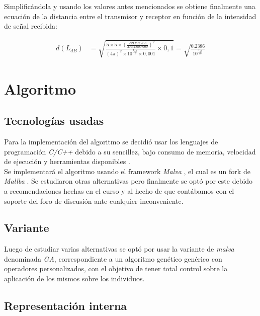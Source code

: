 \documentclass[journal]{IEEEtran}
\begin{document}
Simplificándola y usando los valores antes mencionados se obtiene finalmente una ecuación de la distancia entre el transmisor y receptor en función de la intensidad de señal recibida:

\begin{equation*}
\begin{split}
d(L_{dB}) &= \sqrt {\frac {5 \times 5 \times (\frac {299.792.458} {2.442.000.000})^2} {(4 \pi)^2 \times 10^{\frac {L_{dB}} {10}} \times 0,001} \times 0,1} = \sqrt {\frac {0.2386} {10^{\frac {L_{dB}} {10}}}}
\end{split}
\end{equation*}

\section{Algoritmo}

\subsection{Tecnologías usadas}

Para la implementación del algoritmo se decidió usar los lenguajes de programación \emph{C/C++} \cite{c} \cite{c++} debido a su sencillez, bajo consumo de memoria, velocidad de ejecución y herramientas disponibles \cite{why:c:c++}.\\

Se implementará el algoritmo usando el framework \emph{Malva} \cite{malva}, el cual es un fork de \emph{Mallba} \cite{mallba}. Se estudiaron otras alternativas pero finalmente se optó por este debido a recomendaciones hechas en el curso y al hecho de que contábamos con el soporte del foro de discusión ante cualquier inconveniente.\\

\subsection{Variante}

Luego de estudiar varias alternativas se optó por usar la variante de \emph{malva} denominada \emph{GA}, correspondiente a un algoritmo genético genérico con operadores personalizados, con el objetivo de tener total control sobre la aplicación de los mismos sobre los individuos.\\

\subsection{Representación interna}
\end{document}
